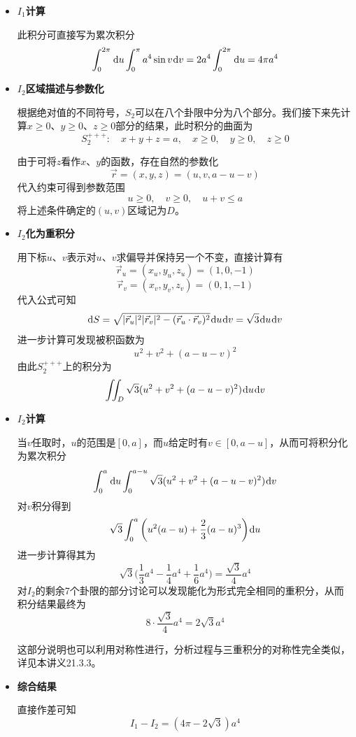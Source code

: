 \documentclass[a4paper,UTF8,fontset=windows,AutoFakeBold]{ctexart}
\newcommand*{\dr}{\hspace{0.07em}\mathrm{d}}
\newcommand*{\rv}{\vec{r}}
\newcommand*{\note}{\noindent *}
\theoremstyle{ex}
\begin{document}
\begin{enumerate}
{\begin{itemize}
            \item \textbf{$I_1$计算}
            
            此积分可直接写为累次积分
            $$\int_0^{2\pi}\dr u\int_0^\pi a^4\sin v\dr v=2a^4\int_0^{2\pi}\dr u=4\pi a^4$$

            \item \textbf{$I_2$区域描述与参数化}
            
            根据绝对值的不同符号，$S_2$可以在八个卦限中分为八个部分。我们接下来先计算$x\ge0$、$y\ge0$、$z\ge0$部分的结果，此时积分的曲面为
            $$S_2^{+++}:\quad x+y+z=a,\quad x\ge0,\quad y\ge0,\quad z\ge0$$

            由于可将$z$看作$x$、$y$的函数，存在自然的参数化
            $$\vec{r}=(x,y,z)=(u,v,a-u-v)$$
            代入约束可得到参数范围
            $$u\ge0,\quad v\ge0,\quad u+v\le a$$
            将上述条件确定的$(u,v)$区域记为$D$。
            
            \item \textbf{$I_2$化为重积分}
            
            用下标$u$、$v$表示对$u$、$v$求偏导并保持另一个不变，直接计算有
            $$\rv_u=(x_u,y_u,z_u)=(1,0,-1)$$
            $$\rv_v=(x_v,y_v,z_v)=(0,1,-1)$$
            代入公式可知
            $$\dr S=\sqrt{|\rv_u|^2|\rv_v|^2-(\rv_u\cdot\rv_v)^2}\dr u\dr v=\sqrt3\dr u\dr v$$
            进一步计算可发现被积函数为
            $$u^2+v^2+(a-u-v)^2$$
            由此$S_2^{+++}$上的积分为
            $$\iint_D\sqrt3(u^2+v^2+(a-u-v)^2)\dr u\dr v$$
            
            \item \textbf{$I_2$计算}
            
            当$v$任取时，$u$的范围是$[0,a]$，而$u$给定时有$v\in[0,a-u]$，从而可将积分化为累次积分
            $$\int_0^a\dr u\int_0^{a-u}\sqrt3(u^2+v^2+(a-u-v)^2)\dr v$$
            对$v$积分得到
            $$\sqrt3\int_0^a\bigg(u^2(a-u)+\frac{2}{3}(a-u)^3\bigg)\dr u$$
            进一步计算得其为
            $$\sqrt3\bigg(\frac{1}{3}a^4-\frac{1}{4}a^4+\frac{1}{6}a^4\bigg)=\frac{\sqrt3}{4}a^4$$
            对$I_2$的剩余7个卦限的部分讨论可以发现能化为形式完全相同的重积分，从而积分结果最终为
            $$8\cdot\frac{\sqrt3}{4}a^4=2\sqrt3a^4$$

            \note 这部分说明也可以利用对称性进行，分析过程与三重积分的对称性完全类似，详见本讲义21.3.3。
            
            \item \textbf{综合结果}
            
            直接作差可知
            $$I_1-I_2=(4\pi-2\sqrt3)a^4$$
        \end{itemize}
    }
\end{enumerate}
\end{document}
